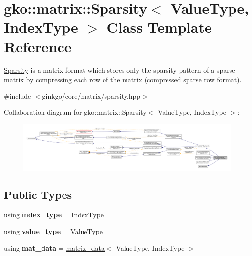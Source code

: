 \hypertarget{classgko_1_1matrix_1_1Sparsity}{}\section{gko\+:\+:matrix\+:\+:Sparsity$<$ Value\+Type, Index\+Type $>$ Class Template Reference}
\label{classgko_1_1matrix_1_1Sparsity}


\hyperlink{classgko_1_1matrix_1_1Sparsity}{Sparsity} is a matrix format which stores only the sparsity pattern of a sparse matrix by compressing each row of the matrix (compressed sparse row format).  




{\ttfamily \#include $<$ginkgo/core/matrix/sparsity.\+hpp$>$}



Collaboration diagram for gko\+:\+:matrix\+:\+:Sparsity$<$ Value\+Type, Index\+Type $>$\+:
\nopagebreak
\begin{figure}[H]
\begin{center}
\leavevmode
\includegraphics[width=350pt]{classgko_1_1matrix_1_1Sparsity__coll__graph}
\end{center}
\end{figure}
\subsection*{Public Types}
\begin{DoxyCompactItemize}
\item 
\mbox{\label{classgko_1_1matrix_1_1Sparsity_af58098a9d00b623afdfcd314312b31d0}} 
using {\bfseries index\+\_\+type} = Index\+Type
\item 
\mbox{\label{classgko_1_1matrix_1_1Sparsity_a2e5ee25884f01879461bb2ba62e7cefa}} 
using {\bfseries value\+\_\+type} = Value\+Type
\item 
\mbox{\label{classgko_1_1matrix_1_1Sparsity_a0b2121e0a3121c7a3c8208b450788799}} 
using {\bfseries mat\+\_\+data} = \hyperlink{structgko_1_1matrix__data}{matrix\+\_\+data}$<$ Value\+Type, Index\+Type $>$
\end{DoxyCompactItemize}
